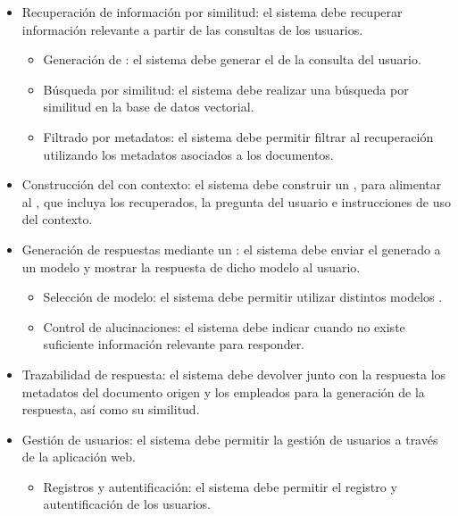\begin{itemize}
\begin{itemize}
		\item {} Eliminar: el sistema debe permitir borrar los  y  de la base de datos vectorial.
	\end{itemize}
	\item {} Recuperación de información por similitud: el sistema debe recuperar información relevante a partir de las consultas de los usuarios.
	\begin{itemize}
	\tightlist
		\item {} Generación de : el sistema debe generar el  de la consulta del usuario.
		\item {} Búsqueda por similitud: el sistema debe realizar una búsqueda por similitud en la base de datos vectorial.
		\item {} Filtrado por metadatos: el sistema debe permitir filtrar al recuperación utilizando los metadatos asociados a los documentos.
	\end{itemize}
	\item {} Construcción del  con contexto: el sistema debe construir un , para alimentar al , que incluya los  recuperados, la pregunta del usuario e instrucciones de uso del contexto.
	\item {} Generación de respuestas mediante un : el sistema debe enviar el  generado a un modelo  y mostrar la respuesta de dicho modelo al usuario.
	\begin{itemize}
	\tightlist
		\item {} Selección de modelo: el sistema debe permitir utilizar distintos modelos .
		\item {} Control de alucinaciones: el sistema debe indicar cuando no existe suficiente información relevante para responder. 
	\end{itemize}
	\item {} Trazabilidad de respuesta: el sistema debe devolver junto con la respuesta los metadatos del documento origen y los  empleados para la generación de la respuesta, así como su similitud. 
	\item {} Gestión de usuarios: el sistema debe permitir la gestión de usuarios a través de la aplicación web.
	\begin{itemize}
	\tightlist
		\item {} Registros y autentificación: el sistema debe permitir el registro y autentificación de los usuarios.

\end{itemize}
\end{itemize}
